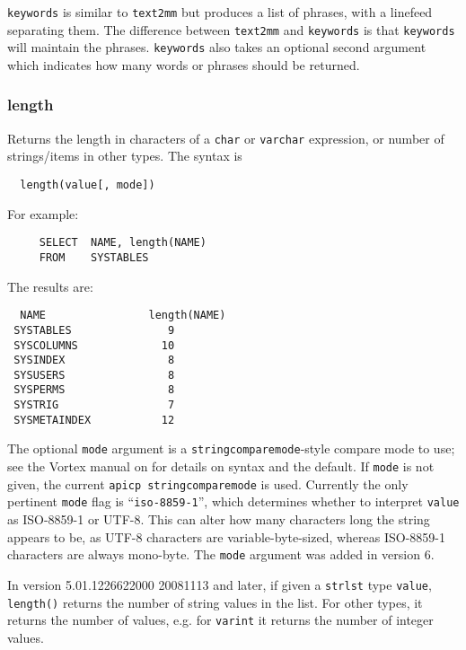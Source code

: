 {\tt keywords} is similar to {\tt text2mm} but produces a list of
phrases, with a linefeed separating them.  The difference between
{\tt text2mm} and {\tt keywords} is that {\tt keywords} will maintain
the phrases.
{\tt keywords} also takes an optional second
argument which indicates how many words or phrases should be returned.

\subsubsection{length}

Returns the length in characters of a \verb`char` or \verb`varchar`
expression, or number of strings/items in other types.  The syntax is
\begin{verbatim}
  length(value[, mode])
\end{verbatim}

For example:

\begin{verbatim}
     SELECT  NAME, length(NAME)
     FROM    SYSTABLES
\end{verbatim}

The results are:

\begin{screen}
\begin{verbatim}
  NAME                length(NAME)
 SYSTABLES               9
 SYSCOLUMNS             10
 SYSINDEX                8
 SYSUSERS                8
 SYSPERMS                8
 SYSTRIG                 7
 SYSMETAINDEX           12
\end{verbatim}
\end{screen}

  The optional \verb`mode` argument is a
\verb`stringcomparemode`-style compare mode to use; see the Vortex manual
on {\tt <apicp stringcomparemode>} for details on syntax and the
default.  If \verb`mode` is not given, the current {\tt apicp
stringcomparemode} is used.  Currently the only pertinent \verb`mode`
flag is ``{\tt iso-8859-1}'', which determines whether to interpret
\verb`value` as ISO-8859-1 or UTF-8.  This can alter how many characters long
the string appears to be, as UTF-8 characters are variable-byte-sized,
whereas ISO-8859-1 characters are always mono-byte.  The \verb`mode`
argument was added in version 6.

  In version 5.01.1226622000 20081113 and later, if given a \verb`strlst`
type \verb`value`, \verb`length()` returns the number of string values
in the list.  For other types, it returns the number of values, e.g.
for \verb`varint` it returns the number of integer values.

